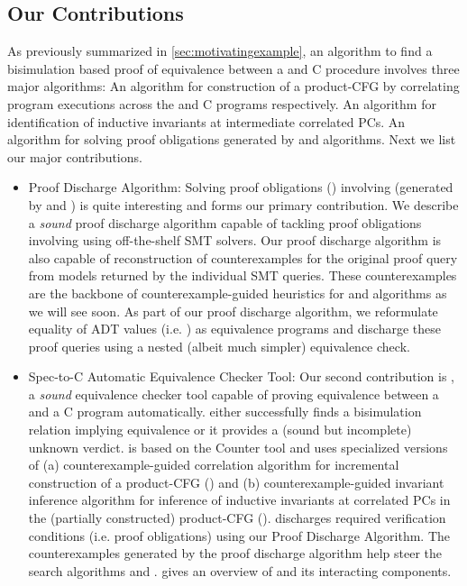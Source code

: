 \subsection{Our Contributions}
\label{sec:contribs}
As previously summarized in \cref{sec:motivatingexample}, an algorithm to find a bisimulation based proof of equivalence
between a \SpecL{} and C procedure involves three major algorithms:
 An algorithm for construction of a product-CFG by correlating program executions
across the \SpecL{} and C programs respectively.
 An algorithm for identification of inductive invariants at intermediate correlated PCs.
 An algorithm for solving proof obligations generated by  and  algorithms.
Next we list our major contributions.

\begin{itemize}
\item Proof Discharge Algorithm: Solving proof obligations () involving \recursiveRelations{}
(generated by  and ) is quite interesting and forms our primary contribution.
We describe a {\em sound} proof discharge algorithm capable of tackling proof obligations involving
\recursiveRelations{} using off-the-shelf SMT solvers. Our proof discharge algorithm is also capable of
reconstruction of counterexamples for the original proof query from models returned by the individual SMT queries.
These counterexamples are the backbone of counterexample-guided heuristics for  and  algorithms
as we will see soon.
As part of our proof discharge algorithm,
we reformulate equality of ADT values (i.e. \recursiveRelations{}) as equivalence programs
and discharge these proof queries using a nested (albeit much simpler) equivalence check.

\item Spec-to-C Automatic Equivalence Checker Tool: Our second contribution is \toolName{}, a {\em sound} equivalence checker tool
capable of proving equivalence between a \SpecL{} and a C program automatically.
\toolName{} either successfully finds a bisimulation relation implying equivalence or it provides a (sound but incomplete) unknown verdict.
\toolName{} is based on the Counter tool\cite{oopsla20} and uses specialized versions of (a) counterexample-guided correlation algorithm for
incremental construction of a product-CFG () and (b) counterexample-guided invariant inference algorithm
for inference of inductive invariants at correlated PCs in the (partially constructed) product-CFG ().
\toolName{} discharges required verification conditions (i.e. proof obligations) using our Proof Discharge Algorithm.
The counterexamples generated by the proof discharge algorithm help steer the search algorithms  and .
 gives an overview of \toolName{} and its interacting components.
\end{itemize}

